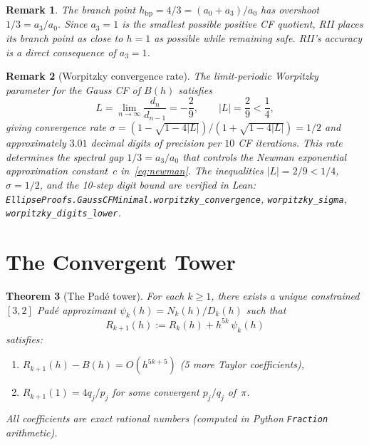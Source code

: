 \documentclass[12pt]{article}
\newtheorem{theorem}{Theorem}[section]
\newtheorem{remark}[theorem]{Remark}
\begin{document}
\begin{remark}
The branch point $h_{\text{bp}} = 4/3 = (a_0+a_3)/a_0$ has overshoot $1/3 = a_3/a_0$. Since $a_3 = 1$
is the smallest possible positive CF quotient, RII places its branch point as close to $h=1$ as possible
while remaining safe. RII's accuracy is a \emph{direct consequence} of $a_3 = 1$.
\end{remark}

\begin{remark}[Worpitzky convergence rate]
The limit-periodic Worpitzky parameter for the Gauss CF of $B(h)$ satisfies~\cite{wang2026}
\[
L = \lim_{n\to\infty} \frac{d_n}{d_{n-1}^{\phantom{x}}} = -\frac{2}{9}, \qquad |L| = \frac{2}{9} < \frac{1}{4},
\]
giving convergence rate $\sigma = (1-\sqrt{1-4|L|})/(1+\sqrt{1-4|L|}) = 1/2$ and approximately
$3.01$ decimal digits of precision per $10$ CF iterations.  This rate determines the spectral gap
$1/3 = a_3/a_0$ that controls the Newman exponential approximation constant~$c$ in~\eqref{eq:newman}.
The inequalities $|L|=2/9 < 1/4$, $\sigma = 1/2$, and the 10-step digit bound are verified in Lean:
\texttt{EllipseProofs.GaussCFMinimal.worpitzky\_convergence},
\texttt{worpitzky\_sigma}, \texttt{worpitzky\_digits\_lower}.
\end{remark}

\section{The Convergent Tower}\label{sec:tower}

\begin{theorem}[The Pad\'e tower]\label{thm:tower}
For each $k \ge 1$, there exists a unique constrained $[3,2]$ Pad\'e approximant
$\psi_k(h) = N_k(h)/D_k(h)$ such that
\begin{equation}\label{eq:tower}
R_{k+1}(h) := R_k(h) + h^{5k}\,\psi_k(h)
\end{equation}
satisfies:
\begin{enumerate}
\item[(i)] $R_{k+1}(h) - B(h) = O(h^{5k+5})$ \quad (5 more Taylor coefficients),
\item[(ii)] $R_{k+1}(1) = 4q_j/p_j$ \quad for some convergent $p_j/q_j$ of~$\pi$.
\end{enumerate}
All coefficients are exact rational numbers (computed in Python \texttt{Fraction} arithmetic).
\end{theorem}
\end{document}
